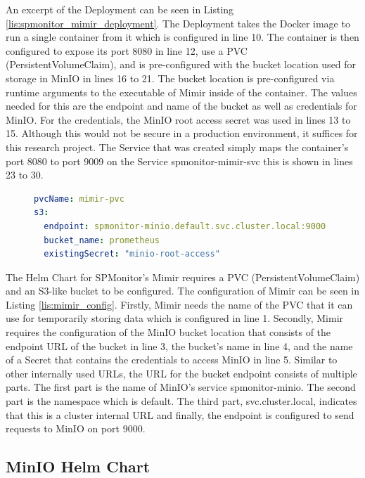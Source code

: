 An excerpt of the Deployment can be seen in Listing \ref{lis:spmonitor_mimir_deployment}.
The Deployment takes the Docker image to run a single container from it which is configured in line 10.
The container is then configured to expose its port 8080 in line 12, use a PVC (PersistentVolumeClaim),
and is pre-configured with the bucket location used for storage in MinIO in lines 16 to 21.
The bucket location is pre-configured via runtime arguments to the executable of Mimir inside
of the container. The values needed for this are the endpoint and name of the bucket as well as
credentials for MinIO. For the credentials, the MinIO root access secret was used in lines 13 to 15.
Although this would not be secure in a production environment, it suffices for this research project.
The Service that was created simply maps the container's port 8080 to port 9009 on the Service
spmonitor-mimir-svc this is shown in lines 23 to 30.

\begin{figure}[tb]
\begin{lstlisting}[caption = {SPMonitor's Mimir Helm Chart Configuration}, label = {lis:mimir_config}, style = kit-cm, language=yaml]
pvcName: mimir-pvc
s3:
  endpoint: spmonitor-minio.default.svc.cluster.local:9000
  bucket_name: prometheus
  existingSecret: "minio-root-access"
\end{lstlisting}
\end{figure}

The Helm Chart for SPMonitor's Mimir requires a PVC (PersistentVolumeClaim) and an S3-like bucket to be configured.
The configuration of Mimir can be seen in Listing \ref{lis:mimir_config}.
Firstly, Mimir needs the name of the PVC that it can use for temporarily storing data which is configured in line 1.
Secondly, Mimir requires the configuration of the MinIO bucket location that consists
of the endpoint URL of the bucket in line 3, the bucket's name in line 4, and the name of a Secret that contains
the credentials to access MinIO in line 5.
Similar to other internally used URLs, the URL for the bucket endpoint consists of multiple parts.
The first part is the name of MinIO's service spmonitor-minio. The second part is the namespace
which is default. The third part, svc.cluster.local, indicates that this is a cluster internal URL
and finally, the endpoint is configured to send requests to MinIO on port 9000.

\subsection*{MinIO Helm Chart}

